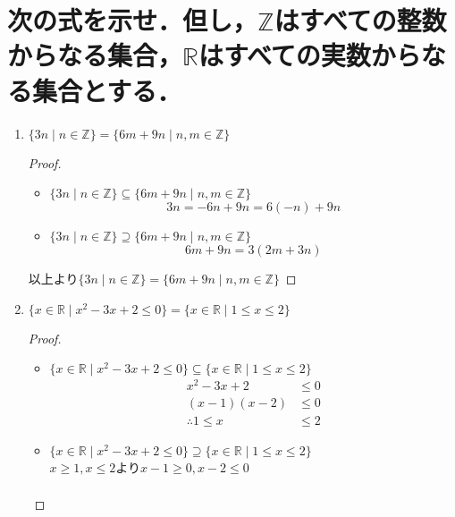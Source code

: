 \documentclass[a4paper,12pt]{ltjsarticle}
\newcommand{\Z}{\mathbb{Z}}
\newcommand{\R}{\mathbb{R}}
\begin{document}
\section{次の式を示せ．但し，$\Z$はすべての整数からなる集合，$\R$はすべての実数からなる集合とする．}
\begin{enumerate}[(1)]
    \item $\{ 3n \mid n \in \Z \} = \{ 6m + 9n \mid n,m \in \Z \}$
        \begin{proof}
            \quad \\
            \begin{itemize}
                \item $\{ 3n \mid n \in \Z \} \subseteq \{ 6m + 9n \mid n,m \in \Z \}$
                    \begin{equation}
                        3n = -6n + 9n = 6(-n) + 9n
                    \end{equation}
                \item $\{ 3n \mid n \in \Z \} \supseteq \{ 6m + 9n \mid n,m \in \Z \}$
                    \begin{equation}
                        6m + 9n = 3(2m + 3n)
                    \end{equation}
            \end{itemize}
            以上より$\{ 3n \mid n \in \Z \} = \{ 6m + 9n \mid n,m \in \Z \}$
        \end{proof}
    \item $\{ x \in \R \mid x^2 - 3x + 2 \leq 0 \} = \{ x \in \R \mid 1 \leq x \leq 2 \}$
        \begin{proof}
            \quad \\
            \begin{itemize}
                \item $\{ x \in \R \mid x^2 - 3x + 2 \leq 0 \} \subseteq \{ x \in \R \mid 1 \leq x \leq 2 \}$
                    \begin{align*}
                        x^2 - 3x + 2 &\leq 0 \\
                        (x - 1)(x - 2) &\leq 0 \\
                        \therefore 1 \leq x &\leq 2
                    \end{align*}
                \item $\{ x \in \R \mid x^2 - 3x + 2 \leq 0 \} \supseteq \{ x \in \R \mid 1 \leq x \leq 2 \}$ \\
                    $x \geq 1, x \leq 2$より$x - 1 \geq 0, x - 2 \leq 0$
                    \begin{align*}

\end{align*}
\end{itemize}
\end{proof}
\end{enumerate}
\end{document}
